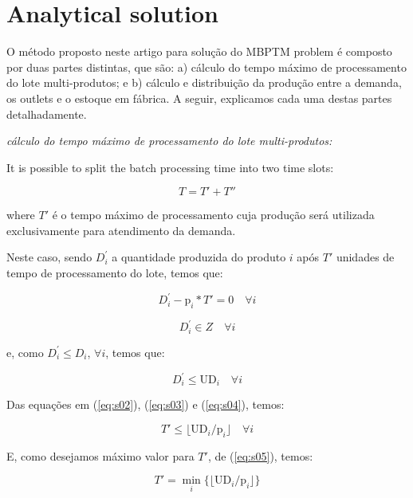 \documentclass[authoryear,manuscript,12pt]{elsarticle}
\begin{document}
\section{Analytical solution}
\label{sec:analyticalSol}

O método proposto neste artigo para solução do MBPTM problem é composto por duas partes distintas, que são: a) cálculo do tempo máximo de processamento do lote multi-produtos; e b) cálculo e distribuição da produção entre a demanda, os outlets e o estoque em fábrica. A seguir, explicamos cada uma destas partes detalhadamente. 

\noindent \emph{cálculo do tempo máximo de processamento do lote multi-produtos:}

It is possible to split the batch processing time into two time slots:

\begin{equation}
T = T' + T''
\end{equation}

\noindent where $T'$ é o tempo máximo de processamento cuja produção será utilizada exclusivamente para atendimento da demanda.

Neste caso, sendo $D_{i}^{'}$ a quantidade produzida do produto $i$ após $T'$ unidades de tempo de processamento do lote, temos que:

\begin{equation}
\label{eq:s02}
D_{i}^{'} - \textrm{p}_i * T'  = 0 \quad \forall i
\end{equation}

\begin{equation}
\label{eq:s03}
D_{i}^{'} \in Z \quad \forall i
\end{equation}

\noindent e, como $D_{i}^{'} \leq D_i$, $\forall i$, temos que:

\begin{equation}
\label{eq:s04}
D_{i}^{'} \leq \textrm{UD}_i\quad \forall i
\end{equation}

Das equações em (\ref{eq:s02}), (\ref{eq:s03}) e (\ref{eq:s04}), temos:

\begin{equation}
\label{eq:s05}
T' \leq \lfloor{\textrm{UD}_i / \textrm{p}_i}\rfloor \quad \forall i
\end{equation}

E, como desejamos máximo valor para $T'$, de (\ref{eq:s05}), temos:

\begin{equation}
\label{eq:s06}
T' = \min_i\{\lfloor{\textrm{UD}_i / \textrm{p}_i}\rfloor\}
\end{equation}
\end{document}
